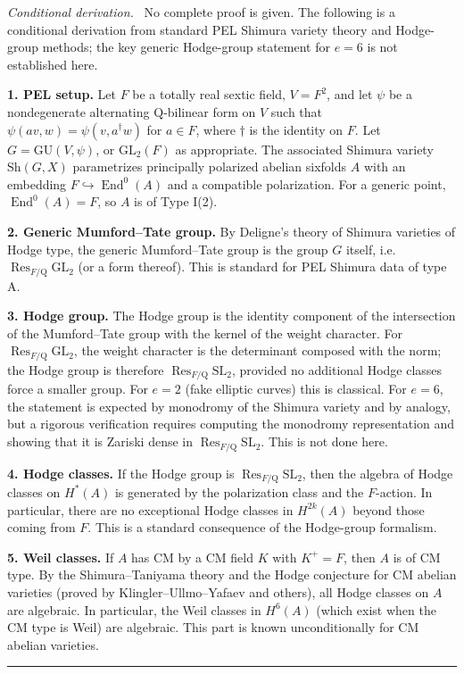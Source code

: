 \documentclass{article}
\newcommand{\mathbb}[1]{\mathrm{#1}}
\newenvironment{proof}[1][Proof]{\par\noindent\textit{#1.}\ }{\hfill\rule{1.2ex}{1.2ex}\par}
\begin{document}
\begin{proof}[Conditional derivation]
No complete proof is given. The following is a conditional derivation from
standard PEL Shimura variety theory and Hodge-group methods; the key generic
Hodge-group statement for $e = 6$ is not established here.

\medskip
\noindent\textbf{1. PEL setup.}
Let $F$ be a totally real sextic field, $V = F^2$, and let $\psi$ be a
nondegenerate alternating $\mathbb{Q}$-bilinear form on $V$ such that
$\psi(av, w) = \psi(v, a^\dagger w)$ for $a \in F$, where $\dagger$ is the
identity on $F$. Let $G = \mathrm{GU}(V, \psi)$, or $\mathrm{GL}_2(F)$ as
appropriate. The associated Shimura variety $\mathrm{Sh}(G, X)$ parametrizes
principally polarized abelian sixfolds $A$ with an embedding
$F \hookrightarrow \operatorname{End}^0(A)$ and a compatible polarization. For a
generic point, $\operatorname{End}^0(A) = F$, so $A$ is of Type I(2).

\medskip
\noindent\textbf{2. Generic Mumford--Tate group.}
By Deligne's theory of Shimura varieties of Hodge type, the generic
Mumford--Tate group is the group $G$ itself, i.e.\
$\operatorname{Res}_{F/\mathbb{Q}} \mathrm{GL}_2$ (or a form thereof). This is
standard for PEL Shimura data of type A.

\medskip
\noindent\textbf{3. Hodge group.}
The Hodge group is the identity component of the intersection of the
Mumford--Tate group with the kernel of the weight character. For
$\operatorname{Res}_{F/\mathbb{Q}} \mathrm{GL}_2$, the weight character is the
determinant composed with the norm; the Hodge group is therefore
$\operatorname{Res}_{F/\mathbb{Q}} \mathrm{SL}_2$, provided no additional Hodge
classes force a smaller group. For $e = 2$ (fake elliptic curves) this is
classical. For $e = 6$, the statement is expected by monodromy of the Shimura
variety and by analogy, but a rigorous verification requires computing the
monodromy representation and showing that it is Zariski dense in
$\operatorname{Res}_{F/\mathbb{Q}} \mathrm{SL}_2$. This is not done here.

\medskip
\noindent\textbf{4. Hodge classes.}
If the Hodge group is $\operatorname{Res}_{F/\mathbb{Q}} \mathrm{SL}_2$, then
the algebra of Hodge classes on $H^*(A)$ is generated by the polarization class
and the $F$-action. In particular, there are no exceptional Hodge classes in
$H^{2k}(A)$ beyond those coming from $F$. This is a standard consequence of the
Hodge-group formalism.

\medskip
\noindent\textbf{5. Weil classes.}
If $A$ has CM by a CM field $K$ with $K^+ = F$, then $A$ is of CM type. By the
Shimura--Taniyama theory and the Hodge conjecture for CM abelian varieties
(proved by Klingler--Ullmo--Yafaev and others), all Hodge classes on $A$ are
algebraic. In particular, the Weil classes in $H^6(A)$ (which exist when the CM
type is Weil) are algebraic. This part is known unconditionally for CM abelian
varieties.


\end{proof}
\end{document}
